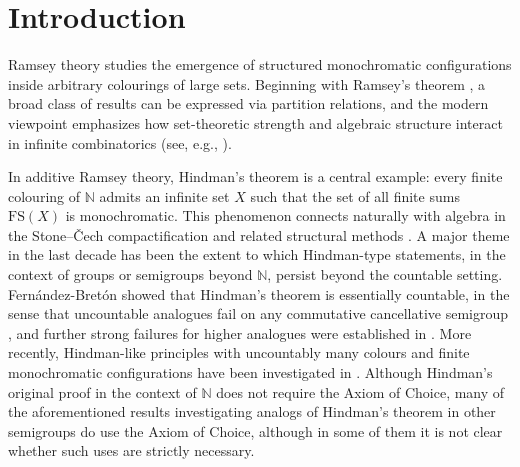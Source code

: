\documentclass{amsart}
\theoremstyle{definition}
\theoremstyle{remark}
\numberwithin{equation}{section}
\begin{document}



\maketitle



\section{Introduction}
Ramsey theory studies the emergence of structured monochromatic configurations inside arbitrary colourings of large sets. 
Beginning with Ramsey's theorem \cite{Ramsey1930}, a broad class of results can be expressed via partition relations, and the modern viewpoint emphasizes how set-theoretic strength and algebraic structure interact in infinite combinatorics (see, e.g., \cite{Jech2003, Kanamori2003, Kunen1980}). 

In additive Ramsey theory, Hindman's theorem \cite{Hindman1974} is a central example: every finite colouring of $\mathbb{N}$ admits an infinite set $X$ such that the set of all finite sums $\mathrm{FS}(X)$ is monochromatic. 
This phenomenon connects naturally with algebra in the Stone--\v{C}ech compactification and related structural methods \cite{HindmanStrauss2012}. A major theme in the last decade has been the extent to which Hindman-type statements, in the context of groups or semigroups beyond $\mathbb N$, persist beyond the countable setting. 
Fern\'andez-Bret\'on showed that Hindman's theorem is essentially countable, in the sense that uncountable analogues fail on any commutative cancellative semigroup \cite{Fernandez2018}, and further strong failures for higher analogues were established in \cite{FernandezRinot2017}. 
More recently, Hindman-like principles with uncountably many colours and finite monochromatic configurations have been investigated in \cite{FernandezLee2020, Komjath2018}. Although Hindman's original proof in the context of $\mathbb N$ does not require the Axiom of Choice, many of the aforementioned results investigating analogs of Hindman's theorem in other semigroups do use the Axiom of Choice, although in some of them it is not clear whether such uses are strictly necessary.
\end{document}
